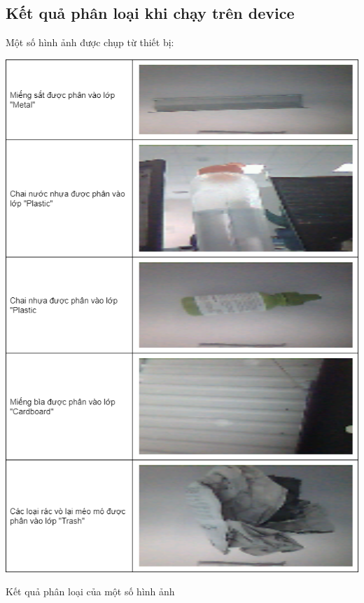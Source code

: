 \subsection{Kết quả phân loại khi chạy trên device}

Một số hình ảnh được chụp từ thiết bị:
\begin{table}[H]
    \centering
    \includegraphics[width=\linewidth]{images/Quanh/Trash Result.png}
    \caption{Kết quả phân loại của một số hình ảnh}
    \label{fig:trash_result}
\end{table}

